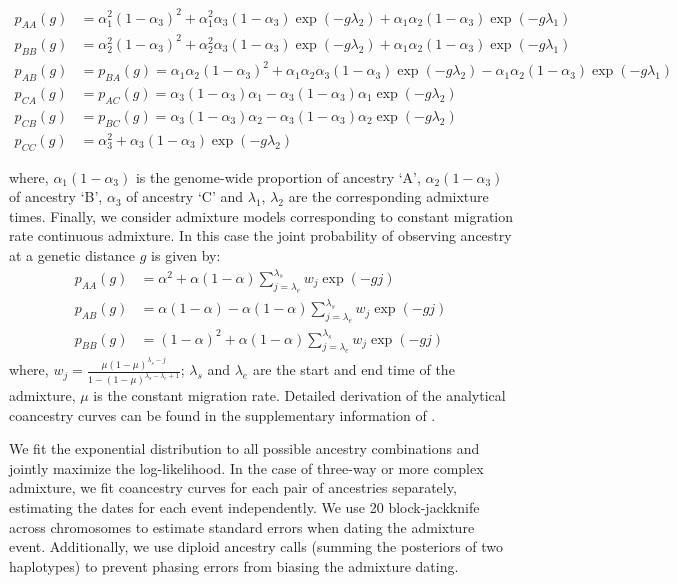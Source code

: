 \begin{small}
\begin{align}
p_{AA}(g) &= \alpha_1^2 (1 - \alpha_3)^2 + \alpha_1^2 \alpha_3 (1 - \alpha_3) \exp(-g \lambda_2) 
+ \alpha_1 \alpha_2 (1 - \alpha_3) \exp(-g \lambda_1) \nonumber \\
p_{BB}(g) &= \alpha_2^2 (1 - \alpha_3)^2 + \alpha_2^2 \alpha_3 (1 - \alpha_3) \exp(-g \lambda_2) 
+ \alpha_1 \alpha_2 (1 - \alpha_3) \exp(-g \lambda_1) \nonumber \\
p_{AB}(g) &= p_{BA}(g) = \alpha_1 \alpha_2 (1 - \alpha_3)^2 
+ \alpha_1 \alpha_2 \alpha_3 (1 - \alpha_3) \exp(-g \lambda_2) 
- \alpha_1 \alpha_2 (1 - \alpha_3) \exp(-g \lambda_1) \nonumber \\
p_{CA}(g) &= p_{AC}(g) = \alpha_3 (1 - \alpha_3) \alpha_1 
- \alpha_3 (1 - \alpha_3) \alpha_1 \exp(-g \lambda_2) \nonumber \\
p_{CB}(g) &= p_{BC}(g) = \alpha_3 (1 - \alpha_3) \alpha_2 
- \alpha_3 (1 - \alpha_3) \alpha_2 \exp(-g \lambda_2) \nonumber \\
p_{CC}(g) &= \alpha_3^2 + \alpha_3 (1 - \alpha_3) \exp(-g \lambda_2)
\end{align}
\end{small}
where, $\alpha_1(1-\alpha_3)$ is the genome-wide proportion of ancestry `A', $\alpha_2(1-\alpha_3)$ of ancestry `B', $\alpha_3$ of ancestry `C' and $\lambda_1$, $\lambda_2$ are the corresponding admixture times. Finally, we consider admixture models corresponding to constant migration rate continuous admixture. In this case the joint probability of observing ancestry at a genetic distance \( g \) is given by:
\begin{align}
p_{AA}(g) &= \alpha^2 + \alpha (1 - \alpha) \sum_{j = \lambda_e}^{\lambda_s} w_j \exp(-g j) \nonumber \\
p_{AB}(g) &= \alpha (1 - \alpha) - \alpha (1 - \alpha) \sum_{j = \lambda_e}^{\lambda_s} w_j \exp(-g j) \nonumber \\
p_{BB}(g) &= (1-\alpha)^2 + \alpha (1 - \alpha) \sum_{j = \lambda_e}^{\lambda_s} w_j \exp(-g j)
\end{align}
where, $w_j = \frac{\mu (1 - \mu)^{\lambda_s - j}}{1 - (1 - \mu)^{\lambda_s - \lambda_e + 1}}$; $\lambda_s$ and $\lambda_e$ are the start and end time of the admixture, $\mu$ is the constant migration rate. Detailed derivation of the analytical coancestry curves can be found in the supplementary information of \cite{hellenthal2014genetic}.

We fit the exponential distribution to all possible ancestry combinations and jointly maximize the log-likelihood. 
%
In the case of three-way or more complex admixture, we fit coancestry curves for each pair of ancestries separately, estimating the dates for each event independently.
%
We use 20 block-jackknife across chromosomes to estimate standard errors when dating the admixture event.
% 
Additionally, we use diploid ancestry calls (summing the posteriors of two haplotypes) to prevent phasing errors from biasing the admixture dating.

